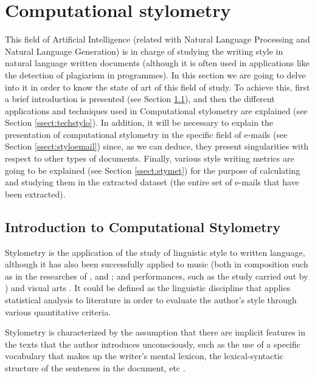 \section{Computational stylometry}
This field of Artificial Intelligence (related with Natural Language Processing and Natural Language Generation) is in charge of studying the writing style in natural language written documents (although it is often used in applications like the detection of plagiarism in programmes). In this section we are going to delve into it in order to know the state of art of this field of study. To achieve this, first a brief introduction is presented (see Section \ref{ssect:introstylo}), and then the different applications and techniques used in Computational stylometry are explained (see Section \ref{ssect:techstylo}). In addition, it will be necessary to explain the presentation of computational stylometry in the specific field of e-mails (see Section \ref{ssect:styloemail}) since, as we can deduce, they present singularities with respect to other types of documents. Finally, various style writing metrics are going to be explained (see Section \ref{ssect:stymet}) for the purpose of calculating and studying them in the extracted dataset (the entire set of e-mails that have been extracted).

\subsection{Introduction to Computational Stylometry}\label{ssect:introstylo}
Stylometry \citep{hughes2012quantitative} is the application of the study of linguistic style to written language, although it has also been successfully applied to music (both in composition such as in the researches of \cite{manaris2005zipf}, \cite{casey2008analysis} and \cite{huron1991ramp}; and performances, such as the study carried out by \cite{sapp2008hybrid}) and visual arts \citep{taylor1999fractal, hughes2010quantification}. It could be defined as the linguistic discipline that applies statistical analysis to literature in order to evaluate the author's style through various quantitative criteria.

Stylometry is characterized by the assumption that there are implicit features in the texts that the author introduces unconsciously, such as the use of a specific vocabulary that makes up the writer's mental lexicon, the lexical-syntactic structure of the sentences in the document, etc \citep{burrows1992computers}.


